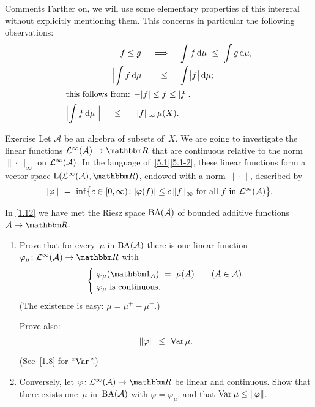 \documentclass[main.tex]{subfiles}
\begin{document}
%
%
\begin{psec}{6.11}{Comments}
Farther on,
we will use some elementary properties of this intergral
without explicitly mentioning them.
This concerns in particular the following observations:
\begin{alignat}{2}
f\leq g\quad\implies\quad 
 &\int f\,\mathrm d\mu \ \leq\ \int g\,\mathrm d\mu\htam{,} \\
\Bigl| \int f\,\mathrm d\mu\ \Bigr|\ \quad\leq\ \quad
 &\int\bigl|f\bigr|\,\mathrm d\mu\htam{;}\\
\intertext{this follows from: $-|f|\leq f\leq |f|$.}
\Bigl| \int f\,\mathrm d\mu\ \Bigr|\ \quad\leq\ \quad
\|f\|_\infty\, \mu(X)\htam{.}
\end{alignat}
\end{psec}
%
%
\begin{psec}{6.12}{Exercise}
Let $\mathcal A$ be an algebra of subsets of~$X$.
We are going to investigate the linear functions $\BLeb(\mathcal A)\ra \R$
that are continuous relative to 
the norm~$\|\cdot\|_\infty$ on $\mathcal{L}^\infty(\mathcal A)$.
In the language of~\ref{5.1}\ref{5.1-2},
these linear functions form a vector space
$\Lin(\BLeb(\mathcal{A}),\R)$,
endowed with a norm~$\|\cdot\|$,
described by
\begin{equation*}
\|\varphi\|\ =\ \inf\bigl\{
c\in[0,\infty)\colon |\varphi(f)|\leq c\,\|f\|_\infty
\text{ for all }f\text{ in }\mathcal{L}^\infty(\mathcal A)\bigr\}\text{.}
\end{equation*}

In \ref{1.12} we have met the Riesz space $\mathrm{BA}(\mathcal A)$
of bounded additive functions $\mathcal A\ra\R$.
\begin{enumerate}
\item\label{6.12-1}
Prove that for every~$\mu$ in $\mathrm{BA}(\mathcal A)$
there is one linear function
$\varphi_\mu\colon \BLeb(\mathcal A)\ra \R$
with
\begin{equation*}
\left\{
\ 
\begin{aligned}
&\varphi_\mu(\mathbb{1}_A)\ =\ \mu(A)\qquad (A\in\mathcal A)\htam{,} \\
&\varphi_\mu\htam{ is continuous.}
\end{aligned}
\right.
\end{equation*}
(The existence is easy: $\mu=\mu^+-\mu^-$.)

Prove also:
\begin{equation*}
\|\varphi\|\ \leq\ \Var{}{\mu}\htam{.}
\end{equation*}
(See~\ref{1.8} for ``$\mathop{\mathrm{Var}}_{}$''.)
%
\item\label{6.12-2}
Conversely,
let $\varphi\colon\BLeb(\mathcal A)\ra\R$ be linear and continuous.
Show that there exists one~$\mu$ in~$\mathrm{BA}(\mathcal A)$
with $\varphi=\varphi_\mu$,
and that $\mathop{\mathrm{Var}}_{}\mu\leq\|\varphi\|$.
\end{enumerate}
\end{psec}
\end{document}

